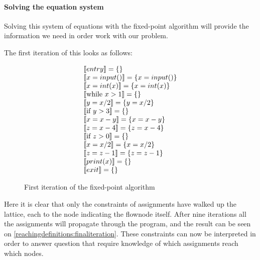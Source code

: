\paragraph{Solving the equation system}
Solving this system of equations with the fixed-point algorithm will provide the information we need in order work with our problem.

The first iteration of this looks as follows:

\begin{figure}[H]
\[
\begin{array}{l}
  \llbracket entry \rrbracket = \{\}\\
  \llbracket x = input() \rrbracket = \{x = input()\}\\
  \llbracket x = int(x) \rrbracket = \{x = int(x)\}\\
  \llbracket \text{while } x > 1 \rrbracket = \{\}\\
  \llbracket  y = x / 2 \rrbracket = \{ y = x / 2\}\\
  \llbracket \text{if } y > 3 \rrbracket = \{\}\\
  \llbracket  x = x-y \rrbracket = \{ x = x - y \} \\
  \llbracket  z = x-4 \rrbracket = \{z = x-4 \} \\
  \llbracket \text{if } z > 0 \rrbracket = \{\}\\
  \llbracket x = x / 2 \rrbracket = \{ x = x / 2 \}\\
  \llbracket z = z - 1 \rrbracket = \{ z = z -1 \} \\
  \llbracket print(x) \rrbracket = \{\}\\
  \llbracket exit \rrbracket = \{\}\\
\end{array}
\]
\caption{First iteration of the fixed-point algorithm}
\label{reachingdefinitions:firstiteration}
\end{figure}

Here it is clear that only the constraints of assignments have walked up the lattice, each to the node indicating the flownode itself.
After nine iterations all the assignments will propagate through the program, and the result can be seen on \cref{reachingdefinitions:finaliteration}.
These constraints can now be interpreted in order to answer question that require knowledge of which assignments reach which nodes.

